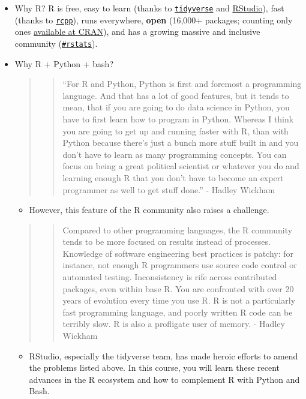 \documentclass[
]{article}
\providecommand{\tightlist}{%
  \setlength{\itemsep}{0pt}\setlength{\parskip}{0pt}}
\begin{document}
\begin{itemize}
\item
  Why R? R is free, easy to learn (thanks to
  \href{https://www.tidyverse.org/}{\texttt{tidyverse}} and
  \href{https://rstudio.com/}{RStudio}), fast (thanks to
  \href{https://cran.r-project.org/web/packages/Rcpp/index.html}{\texttt{rcpp}}),
  runs everywhere, \textbf{open} (16,000+ packages; counting only ones
  \href{https://cran.r-project.org/web/packages/}{available at CRAN}),
  and has a growing massive and inclusive community
  (\href{https://twitter.com/search?q=\%23rstats\&src=typed_query}{\texttt{\#rstats}}).
\item
  Why R + Python + bash?

  \begin{quote}
  \begin{quote}
  ``For R and Python, Python is first and foremost a programming
  language. And that has a lot of good features, but it tends to mean,
  that if you are going to do data science in Python, you have to first
  learn how to program in Python. Whereas I think you are going to get
  up and running faster with R, than with Python because there's just a
  bunch more stuff built in and you don't have to learn as many
  programming concepts. You can focus on being a great political
  scientist or whatever you do and learning enough R that you don't have
  to become an expert programmer as well to get stuff done.'' - Hadley
  Wickham
  \end{quote}
  \end{quote}

  \begin{itemize}
  \tightlist
  \item
    However, this feature of the R community also raises a challenge.
  \end{itemize}

  \begin{quote}
  \begin{quote}
  Compared to other programming languages, the R community tends to be
  more focused on results instead of processes. Knowledge of software
  engineering best practices is patchy: for instance, not enough R
  programmers use source code control or automated testing.
  Inconsistency is rife across contributed packages, even within base R.
  You are confronted with over 20 years of evolution every time you use
  R. R is not a particularly fast programming language, and poorly
  written R code can be terribly slow. R is also a profligate user of
  memory. - Hadley Wickham
  \end{quote}
  \end{quote}

  \begin{itemize}
  \tightlist
  \item
    RStudio, especially the tidyverse team, has made heroic efforts to
    amend the problems listed above. In this course, you will learn
    these recent advances in the R ecosystem and how to complement R
    with Python and Bash.
  \end{itemize}
\end{itemize}
\end{document}
